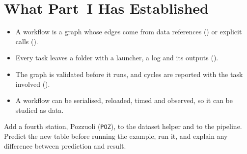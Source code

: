 \section{What Part~I Has Established}

\begin{itemize}[leftmargin=1.4em]
  \item A workflow is a graph whose edges come from data references
    () or explicit calls ().
  \item Every task leaves a folder with a launcher, a log and its outputs
    ().
  \item The graph is validated before it runs, and cycles are reported with
    the task involved ().
  \item A workflow can be serialised, reloaded, timed and observed, so it can
    be studied as data.
\end{itemize}

\begin{exercise}
Add a fourth station, Pozzuoli (\texttt{POZ}), to the dataset helper and to
the pipeline. Predict the new table before running the example, run it, and
explain any difference between prediction and result.
\end{exercise}
